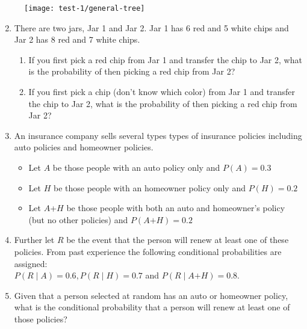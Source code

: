\documentclass{article}
\begin{document}
\begin{itemize}
\begin{figure}[H]
        \center\texttt{[image: test-1/general-tree]}
    \end{figure}\bigskip
    \begin{enumerate}\setcounter{enumi}{1}
        \item There are two jars, Jar 1 and Jar 2. Jar 1 has 6 red and 5 white chips and Jar 2 has 8 red and 7 white chips.
        \begin{enumerate}
            \item If you first pick a red chip from Jar 1 and transfer the chip to Jar 2, what is the probability of then picking a red chip from Jar 2?\vspace{50pt}
            \item If you first pick a chip (don't know which color) from Jar 1 and transfer the chip to Jar 2, what is the probability of then picking a red chip from Jar 2?\vspace{100pt}
        \end{enumerate}\newpage
        \item An insurance company sells several types types of insurance policies including auto policies and homeowner policies.
        \begin{itemize}
            \item Let $A$ be those people with an auto policy only and $P(A) = 0.3$
            \item Let $H$ be those people with an homeowner policy only and $P(H) = 0.2$
            \item Let $A$+$H$ be those people with both an auto and homeowner's policy (but no other policies) and $P(A\text{+}H) = 0.2$
        \end{itemize}
        \item[] Further let $R$ be the event that the person will renew at least one of these policies. From past experience the following conditional probabilities are assigned: \medskip\\$P(R \mid A) = 0.6, P(R \mid H) = 0.7$ and $P(R \mid A \text{+} H) = 0.8$.
        \item[] Given that a person selected at random has an auto or homeowner policy, what is the conditional probability that a person will renew at least one of those policies?
    \end{enumerate}
\end{itemize}\bigskip
\end{document}
